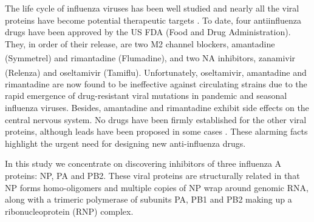 The life cycle of influenza viruses has been well studied \citep{1539,1522,1525} and nearly all the viral proteins have become potential therapeutic targets \citep{1539,1519,1229,1523,1525}. To date, four antiinfluenza drugs have been approved by the US FDA (Food and Drug Administration). They, in order of their release, are two M2 channel blockers, amantadine (Symmetrel\textsuperscript{\textregistered}) and rimantadine (Flumadine\textsuperscript{\textregistered}), and two NA inhibitors, zanamivir (Relenza\textsuperscript{\textregistered}) and oseltamivir (Tamiflu\textsuperscript{\textregistered}). Unfortunately, oseltamivir, amantadine and rimantadine are now found to be ineffective against circulating strains due to the rapid emergence of drug-resistant viral mutations in pandemic and seasonal influenza viruses. Besides, amantadine and rimantadine exhibit side effects on the central nervous system. No drugs have been firmly established for the other viral proteins, although leads have been proposed in some cases \citep{1229,1522,1523,1525}. These alarming facts highlight the urgent need for designing new anti-influenza drugs.




In this study we concentrate on discovering inhibitors of three influenza A proteins: NP, PA and PB2. These viral proteins are structurally related in that NP forms homo-oligomers and multiple copies of NP wrap around genomic RNA, along with a trimeric polymerase of subunits PA, PB1 and PB2 making up a ribonucleoprotein (RNP) complex.

